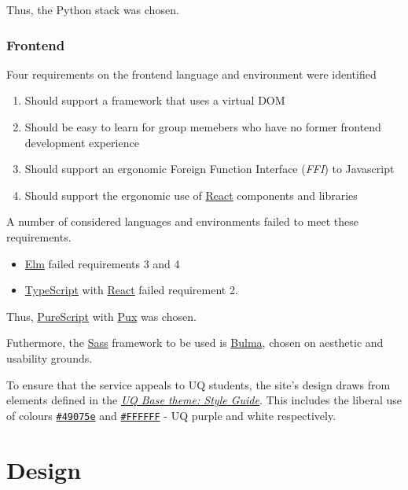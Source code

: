 \documentclass[11pt,a4paper]{report}
\begin{document}
Thus, the Python stack was chosen.

\subsection{Frontend}


Four requirements on the frontend language and environment were identified

\begin{enumerate}
    \item Should support a framework that uses a virtual DOM
    \item Should be easy to learn for group memebers who have no former frontend development experience
    \item Should support an ergonomic Foreign Function Interface (\textit{FFI}) to Javascript
    \item Should support the ergonomic use of \href{https://facebook.github.io/react/}{React} components and libraries
\end{enumerate}


A number of considered languages and environments failed to meet these requirements.


\begin{itemize}
    \item \href{http://elm-lang.org/}{Elm} failed requirements 3 and 4
    \item \href{https://www.typescriptlang.org/}{TypeScript} with \href{https://facebook.github.io/react/}{React} failed requirement 2.
\end{itemize}

Thus, \href{http://www.purescript.org/}{PureScript} with \href{http://www.purescript-pux.org/}{Pux} was chosen.

Futhermore, the \href{https://sass-lang.com/}{Sass} framework to be used is \href{http://bulma.io/}{Bulma}, chosen on aesthetic and usability grounds.

To ensure that the service appeals to UQ students, the site's design draws from elements defined in the \href{http://drupal.uq.edu.au/guide/uq-base-theme-style-guide}{\textit{UQ Base theme: Style Guide}}. This includes the liberal use of colours \href{http://www.color-hex.com/color/49075e}{\texttt{\#49075e}} and \href{http://www.color-hex.com/color/ffffff}{\texttt{\#FFFFFF}} - UQ purple and white respectively.


\chapter{Design}
\end{document}
